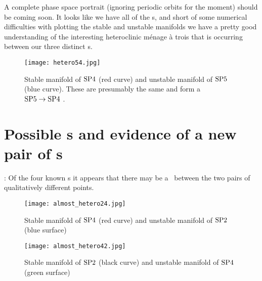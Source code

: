    A complete phase space portrait (ignoring periodic orbits for
   the moment) should be coming soon. It looks like we have all of
   the \stagp s, and short of some numerical difficulties with
   plotting the stable and unstable manifolds we have a pretty good
   understanding of the interesting heteroclinic m\'enage \`a trois that is
   occurring between our three distinct \stagp s.

\begin{figure}[!h]
\texttt{[image: hetero54.jpg]}
  \caption{
   Stable manifold of ${{\text{SP4}}}$ (red curve) and unstable manifold of ${{\text{SP5}}}$ (blue curve).
   These are presumably the same and form a ${{\text{SP5}}} \to {\ensuremath{{\text{SP4}}}}$ \hec.
   }
  \label{eltonFig:hetero54}
 \end{figure}


\section{Possible \hec s and evidence of a new
pair of \stagp s}
\label{sec:possibleconnect}

:
 Of the four known \stagp s it appears that there may be a
 \hec\ between the two pairs of qualitatively different
 points.
  \begin{figure}[!h]
\texttt{[image: almost\_hetero24.jpg]}
  \caption{
   Stable manifold of ${{\text{SP4}}}$ (red curve)
   and unstable manifold of ${{\text{SP2}}}$ (blue surface)}
  \label{eltonFig:almost_hetero24}
 \end{figure}
\begin{figure}[!h]
\texttt{[image: almost\_hetero42.jpg]}
  \caption{
   Stable manifold of ${{\text{SP2}}}$ (black curve)
   and unstable manifold of ${{\text{SP4}}}$ (green surface) }
  \label{eltonFig:almost_hetero42}
 \end{figure}

